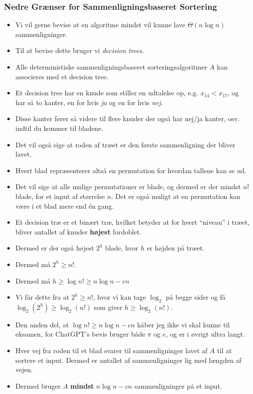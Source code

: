 \begin{frame}[allowframebreaks]
  \frametitle{Nedre Grænser for Sammenligningsbaseret Sortering}
  \begin{itemize}
	\item Vi vil gerne bevise at en algoritme mindst vil kunne lave $\Theta(n \log n)$ sammenligninger.
	\item Til at bevise dette bruger vi \textit{decision trees}.
	\item Alle deterministiske sammenligningsbaseret sorteringsalgoritmer $A$  kan associeres med et decision tree.
	\item Et decision tree har en knude som stiller en udtalelse op, e.g. $x_{14} < x_{17}$, og har så to kanter, en for hvis \textit{ja} og en for hvis \textit{nej}.
	\item Disse kanter fører så videre til flere knuder der også har nej/ja kanter, osv. indtil du kommer til bladene.
	\item Det vil også sige at roden af træet er den første sammenligning der bliver lavet.
	\item Hvert blad repræsenterer altså en permutation for hvordan tallene kan se ud.
	\item Det vil sige at alle mulige permutationer er blade, og dermed er der mindst $n!$ blade, for et input af størrelse $n$. Det er også muligt at en permutation kan være i et blad mere end én gang.
	\item Et decision træ er et binært træ, hvilket betyder at for hvert ``niveau'' i træet, bliver antallet af knuder \textbf{højest} fordoblet.
	\item Dermed er der også højest $2^{h}$ blade, hvor $h$ er højden på træet.
	\item Dermed må $2^{h} \ge n!$.
	\item Dermed må $h \ge \log n! \ge n \log n - cn$
	\item Vi får dette fra at $2^{h} \ge n!$, hvor vi kan tage $\log_{2}$ på begge sider og få $\log_{2}(2^{h}) \ge \log_{2}(n!)$ som giver $h \ge \log_{2}(n!)$.
	\item Den anden del, at $\log n! \ge n \log n - cn$ håber jeg ikke vi skal kunne til eksamen, for ChatGPT's bevis bruger både $\pi$ og $e$, og er i øvrigt ultra langt.
	\item Hver vej fra roden til et blad svarer til sammenligninger lavet af $A$ til at sortere et input. Dermed er antallet af sammenligninger lig med længden af vejen.
	\item Dermed bruger $A$ \textbf{mindst} $n \log n - cn$ sammenligninger på et input.

\end{itemize}
\end{frame}
